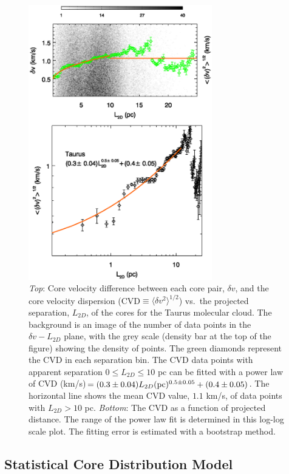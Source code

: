 \documentclass[iop,revtex4]{emulateapj}
\begin{document}
\begin{figure}[htbp]
\begin{minipage}[b]{0.45\textwidth}
\includegraphics[width=8cm]{vdis_all_all.eps}
\end{minipage}
\caption{{\it Top}: Core velocity difference between each core pair, $\delta v$, and the core velocity dispersion
(CVD$\equiv \langle\delta v^2\rangle^{1/2}$) vs.\ the
projected separation, $L_{2D}$, of the cores for the Taurus molecular cloud. The background is an
image of the number of data points in the $\delta v - L_{2D}$ plane, with the
grey scale (density bar at the top of the figure) showing the
density of points. The green diamonds represent the CVD in each
separation bin. The CVD data points with apparent separation $ 0
\leq L_{2D} \leq 10$  pc can be fitted with a power law of CVD
(km/s)$=(0.3\pm 0.04)L_{2D} ({\rm pc})^{0.5\pm 0.05}+(0.4\pm 0.05)$. The horizontal line shows the
mean CVD value, $1.1$ km/s, of data points with $L_{2D}> 10$ pc. {\it Bottom}: The CVD as a function of projected distance. The range of the power law fit is determined in this log-log scale plot. The fitting error is estimated with a bootstrap method.}
\label{fig:vdis_all}
\end{figure}



\subsection{Statistical Core Distribution Model}
\label{subsec:random_cores}
\end{document}
